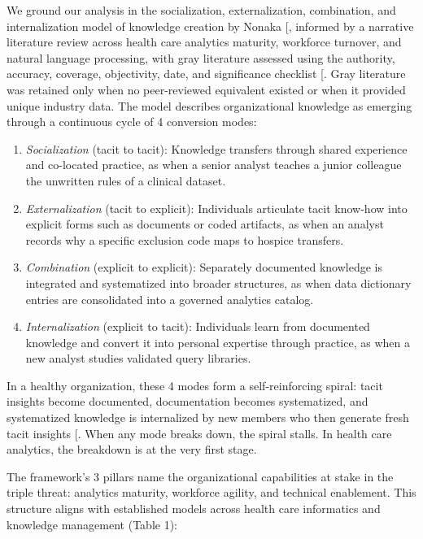 \documentclass[
  american,
  11pt,
  letterpaper,
  oneside  ,captions=tableheading
]{scrartcl}
\providecommand{\tightlist}{%
  \setlength{\itemsep}{0pt}\setlength{\parskip}{0pt}}
\begin{document}
We ground our analysis in the socialization, externalization,
combination, and internalization model of knowledge creation by Nonaka
{[}\citeproc{ref-farnese2019}{20}{]}, informed by a narrative literature
review across health care analytics maturity, workforce turnover, and
natural language processing, with gray literature assessed using the
authority, accuracy, coverage, objectivity, date, and significance
checklist {[}\citeproc{ref-tyndall2010}{21}{]}. Gray literature was
retained only when no peer-reviewed equivalent existed or when it
provided unique industry data. The model describes organizational
knowledge as emerging through a continuous cycle of 4 conversion modes:

\begin{enumerate}
\def\labelenumi{\arabic{enumi}.}
\tightlist
\item
  \emph{Socialization} (tacit to tacit): Knowledge transfers through
  shared experience and co-located practice, as when a senior analyst
  teaches a junior colleague the unwritten rules of a clinical dataset.
\item
  \emph{Externalization} (tacit to explicit): Individuals articulate
  tacit know-how into explicit forms such as documents or coded
  artifacts, as when an analyst records why a specific exclusion code
  maps to hospice transfers.
\item
  \emph{Combination} (explicit to explicit): Separately documented
  knowledge is integrated and systematized into broader structures, as
  when data dictionary entries are consolidated into a governed
  analytics catalog.
\item
  \emph{Internalization} (explicit to tacit): Individuals learn from
  documented knowledge and convert it into personal expertise through
  practice, as when a new analyst studies validated query libraries.
\end{enumerate}

In a healthy organization, these 4 modes form a self-reinforcing spiral:
tacit insights become documented, documentation becomes systematized,
and systematized knowledge is internalized by new members who then
generate fresh tacit insights {[}\citeproc{ref-farnese2019}{20}{]}. When
any mode breaks down, the spiral stalls. In health care analytics, the
breakdown is at the very first stage.

The framework's 3 pillars name the organizational capabilities at stake
in the triple threat: analytics maturity, workforce agility, and
technical enablement. This structure aligns with established models
across health care informatics and knowledge management (Table 1):
\end{document}
